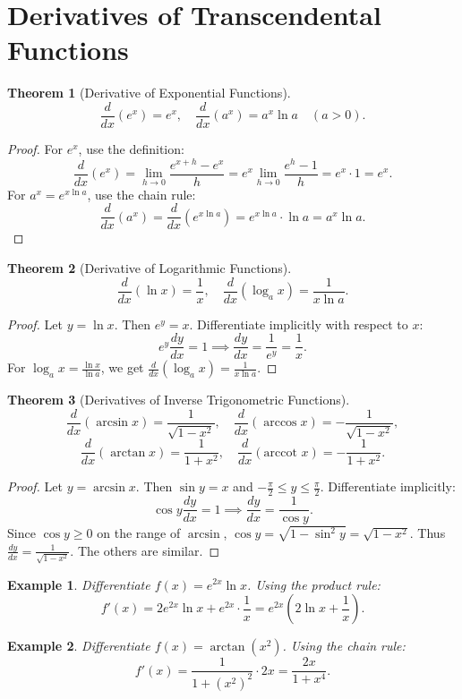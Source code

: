\documentclass[11pt,a4paper]{article}
\newtheorem{example}{Example}
\newtheorem{theorem}{Theorem}
\begin{document}
\section{Derivatives of Transcendental Functions}
\begin{theorem}[Derivative of Exponential Functions]
\[
\frac{d}{dx} (e^x) = e^x, \quad \frac{d}{dx} (a^x) = a^x \ln a \quad (a > 0).
\]
\end{theorem}
\begin{proof}
For $e^x$, use the definition:
\[
\frac{d}{dx} (e^x) = \lim_{h \to 0} \frac{e^{x+h} - e^x}{h} = e^x \lim_{h \to 0} \frac{e^h - 1}{h} = e^x \cdot 1 = e^x.
\]
For $a^x = e^{x \ln a}$, use the chain rule:
\[
\frac{d}{dx} (a^x) = \frac{d}{dx} (e^{x \ln a}) = e^{x \ln a} \cdot \ln a = a^x \ln a.
\]
\end{proof}
\begin{theorem}[Derivative of Logarithmic Functions]
\[
\frac{d}{dx} (\ln x) = \frac{1}{x}, \quad \frac{d}{dx} (\log_a x) = \frac{1}{x \ln a}.
\]
\end{theorem}
\begin{proof}
Let $y = \ln x$. Then $e^y = x$. Differentiate implicitly with respect to $x$:
\[
e^y \frac{dy}{dx} = 1 \implies \frac{dy}{dx} = \frac{1}{e^y} = \frac{1}{x}.
\]
For $\log_a x = \frac{\ln x}{\ln a}$, we get $\frac{d}{dx} (\log_a x) = \frac{1}{x \ln a}$.
\end{proof}
\begin{theorem}[Derivatives of Inverse Trigonometric Functions]
\[
\frac{d}{dx} (\arcsin x) = \frac{1}{\sqrt{1 - x^2}}, \quad \frac{d}{dx} (\arccos x) = -\frac{1}{\sqrt{1 - x^2}},
\]
\[
\frac{d}{dx} (\arctan x) = \frac{1}{1 + x^2}, \quad \frac{d}{dx} (\text{arccot } x) = -\frac{1}{1 + x^2}.
\]
\end{theorem}
\begin{proof}
Let $y = \arcsin x$. Then $\sin y = x$ and $-\frac{\pi}{2} \leq y \leq \frac{\pi}{2}$. Differentiate implicitly:
\[
\cos y \frac{dy}{dx} = 1 \implies \frac{dy}{dx} = \frac{1}{\cos y}.
\]
Since $\cos y \geq 0$ on the range of $\arcsin$, $\cos y = \sqrt{1 - \sin^2 y} = \sqrt{1 - x^2}$. Thus $\frac{dy}{dx} = \frac{1}{\sqrt{1 - x^2}}$.
The others are similar.
\end{proof}
\begin{example}
Differentiate $f(x) = e^{2x} \ln x$.
Using the product rule:
\[
f'(x) = 2e^{2x} \ln x + e^{2x} \cdot \frac{1}{x} = e^{2x} \left( 2 \ln x + \frac{1}{x} \right).
\]
\end{example}
\begin{example}
Differentiate $f(x) = \arctan(x^2)$.
Using the chain rule:
\[
f'(x) = \frac{1}{1 + (x^2)^2} \cdot 2x = \frac{2x}{1 + x^4}.
\]
\end{example}
\end{document}
